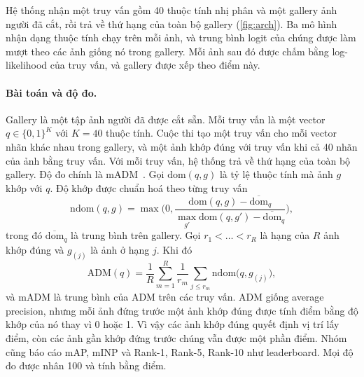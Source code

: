 \documentclass[10pt,twocolumn,letterpaper]{article}
\begin{document}
Hệ thống nhận một truy vấn gồm 40 thuộc tính nhị phân và một gallery ảnh người đã cắt, rồi trả về thứ hạng của toàn bộ gallery (\cref{fig:arch}). Ba mô hình nhận dạng thuộc tính chạy trên mỗi ảnh, và trung bình logit của chúng được làm mượt theo các ảnh giống nó trong gallery. Mỗi ảnh sau đó được chấm bằng log-likelihood của truy vấn, và gallery được xếp theo điểm này.

\paragraph{Bài toán và độ đo.} Gallery là một tập ảnh người đã được cắt sẵn. Mỗi truy vấn là một vector $q\in\{0,1\}^{K}$ với $K=40$ thuộc tính. Cuộc thi tạo một truy vấn cho mỗi vector nhãn khác nhau trong gallery, và một ảnh khớp đúng với truy vấn khi cả 40 nhãn của ảnh bằng truy vấn. Với mỗi truy vấn, hệ thống trả về thứ hạng của toàn bộ gallery. Độ đo chính là mADM~\cite{specker23}. Gọi $\mathrm{dom}(q,g)$ là tỷ lệ thuộc tính mà ảnh $g$ khớp với $q$. Độ khớp được chuẩn hoá theo từng truy vấn
\begin{equation}
\mathrm{ndom}(q,g)=\max\Big(0,\frac{\mathrm{dom}(q,g)-\overline{\mathrm{dom}}_q}{\max_{g'}\mathrm{dom}(q,g')-\overline{\mathrm{dom}}_q}\Big),
\label{eq:ndom}
\end{equation}
trong đó $\overline{\mathrm{dom}}_q$ là trung bình trên gallery. Gọi $r_1<\dots<r_R$ là hạng của $R$ ảnh khớp đúng và $g_{(j)}$ là ảnh ở hạng $j$. Khi đó
\begin{equation}
\mathrm{ADM}(q)=\frac1R\sum_{m=1}^{R}\frac{1}{r_m}\sum_{j\le r_m}\mathrm{ndom}\big(q,g_{(j)}\big),
\label{eq:adm}
\end{equation}
và mADM là trung bình của ADM trên các truy vấn. ADM giống average precision, nhưng mỗi ảnh đứng trước một ảnh khớp đúng được tính điểm bằng độ khớp của nó thay vì 0 hoặc 1. Vì vậy các ảnh khớp đúng quyết định vị trí lấy điểm, còn các ảnh gần khớp đứng trước chúng vẫn được một phần điểm. Nhóm cũng báo cáo mAP, mINP và Rank-1, Rank-5, Rank-10 như leaderboard. Mọi độ đo được nhân 100 và tính bằng điểm.
\end{document}
